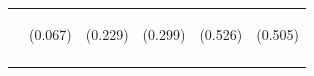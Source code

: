 \documentclass[dv_diss_main.tex]{subfiles}
\begin{document}
\begin{table}[H]
\begin{center}
\begin{tabular}{lccccc}
    & \begin{footnotesize}(0.067)\end{footnotesize} & \begin{footnotesize}(0.229)\end{footnotesize} & \begin{footnotesize}(0.299)\end{footnotesize} & \begin{footnotesize}(0.526)\end{footnotesize} & \begin{footnotesize}(0.505)\end{footnotesize} \\
    \vspace{-1.5pt} & \vspace{-1.5pt} & \vspace{-1.5pt} & \vspace{-1.5pt} & \vspace{-1.5pt} \\
    

\end{tabular}
\end{center}
\end{table}
\end{document}
